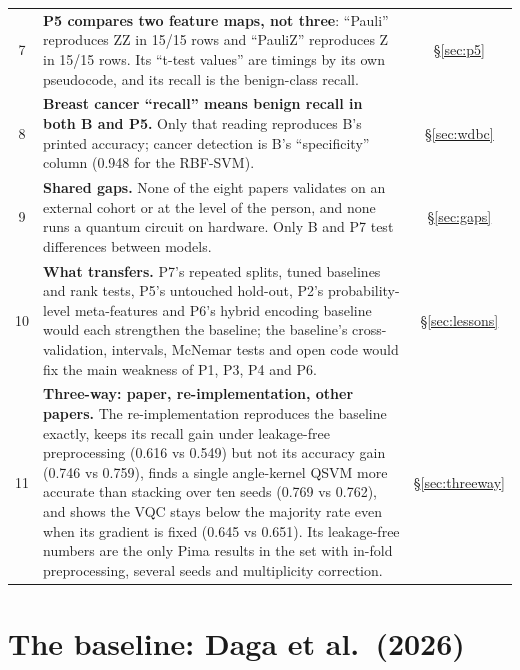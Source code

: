 \documentclass[11pt,a4paper]{article}
\newcommand{\WARN}[1]{\textcolor{warn}{\textbf{#1}}}
\begin{document}
\begin{table}[H]
\begin{tabularx}{\textwidth}{c Y c}
7 & \WARN{P5 compares two feature maps, not three}: ``Pauli'' reproduces ZZ in 15/15 rows and ``PauliZ'' reproduces Z in 15/15 rows. Its ``t-test values'' are timings by its own pseudocode, and its recall is the benign-class recall. & \S\ref{sec:p5} \\
8 & \WARN{Breast cancer ``recall'' means benign recall in both B and P5.} Only that reading reproduces B's printed accuracy; cancer detection is B's ``specificity'' column (0.948 for the RBF-SVM). & \S\ref{sec:wdbc} \\
9 & \textbf{Shared gaps.} None of the eight papers validates on an external cohort or at the level of the person, and none runs a quantum circuit on hardware. Only B and P7 test differences between models. & \S\ref{sec:gaps} \\
10 & \textbf{What transfers.} P7's repeated splits, tuned baselines and rank tests, P5's untouched hold-out, P2's probability-level meta-features and P6's hybrid encoding baseline would each strengthen the baseline; the baseline's cross-validation, intervals, McNemar tests and open code would fix the main weakness of P1, P3, P4 and P6. & \S\ref{sec:lessons} \\
11 & \textbf{Three-way: paper, re-implementation, other papers.} The re-implementation reproduces the baseline exactly, keeps its recall gain under leakage-free preprocessing (0.616 vs 0.549) but not its accuracy gain (0.746 vs 0.759), finds a single angle-kernel QSVM more accurate than stacking over ten seeds (0.769 vs 0.762), and shows the VQC stays below the majority rate even when its gradient is fixed (0.645 vs 0.651). Its leakage-free numbers are the only Pima results in the set with in-fold preprocessing, several seeds and multiplicity correction. & \S\ref{sec:threeway} \\
\bottomrule
\end{tabularx}
\end{table}

\section{The baseline: Daga et al.\ (2026)}
\label{sec:base}
\end{document}

